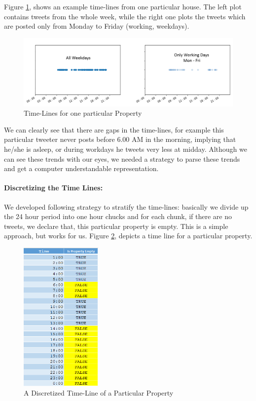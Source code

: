 \documentclass[12pt]{report}
\theoremstyle{named}
\begin{document}
Figure \ref{fig:ExampleTimeLine}, shows an example time-lines from one particular house. The left plot contains tweets from the whole week, while the right one plots the tweets which are posted only from Monday to Friday (working, weekdays).

\begin{figure}[ht]
\centering
        \includegraphics[width=150mm,scale=1]{Images/ExampleTimelines.PNG}
    \caption{Time-Lines for one particular Property}
    \label{fig:ExampleTimeLine}
\end{figure}

We can clearly see that there are gaps in the time-lines, for example this particular tweeter never posts before 6.00 AM in the morning, implying that he/she is asleep, or during workdays he tweets very less at midday. Although we can see these trends with our eyes, we needed a strategy to parse these trends and get a computer understandable representation. 
\paragraph{Discretizing the Time Lines:\\}
We developed following strategy to stratify the time-lines: basically we divide up the 24 hour period into one hour chucks and for each chunk, if there are no tweets, we declare that, this particular property is empty. This is a simple approach, but works for us. Figure \ref{fig:DiscritizedTimeLine}, depicts a time line for a particular property.
\begin{figure}[ht]
\centering
        \includegraphics[width=40mm,scale=0.5]{Images/DiscritizedTimeLine.PNG}
    \caption{A Discretized Time-Line of a Particular Property}
    \label{fig:DiscritizedTimeLine}
\end{figure}
\end{document}
